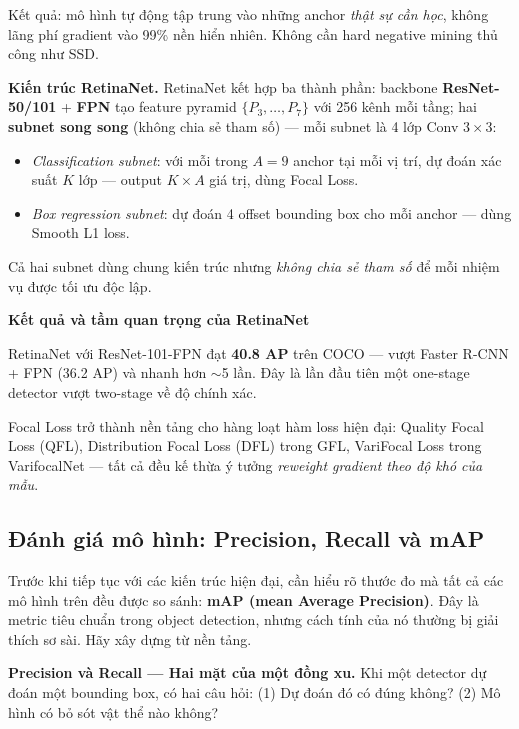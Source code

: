 Kết quả: mô hình tự động tập trung vào những anchor \textit{thật sự cần học}, không lãng phí gradient vào 99\% nền hiển nhiên. Không cần hard negative mining thủ công như SSD.

\textbf{Kiến trúc RetinaNet.}
RetinaNet kết hợp ba thành phần: backbone \textbf{ResNet-50/101} + \textbf{FPN} tạo feature pyramid $\{P_3, \ldots, P_7\}$ với 256 kênh mỗi tầng; hai \textbf{subnet song song} (không chia sẻ tham số) --- mỗi subnet là 4 lớp Conv $3\times3$:
\begin{itemize}
    \item \textit{Classification subnet}: với mỗi trong $A = 9$ anchor tại mỗi vị trí, dự đoán xác suất $K$ lớp --- output $K \times A$ giá trị, dùng Focal Loss.
    \item \textit{Box regression subnet}: dự đoán 4 offset bounding box cho mỗi anchor --- dùng Smooth L1 loss.
\end{itemize}

Cả hai subnet dùng chung kiến trúc nhưng \textit{không chia sẻ tham số} để mỗi nhiệm vụ được tối ưu độc lập.

\begin{mdframed}[style=infobox]
\textbf{Kết quả và tầm quan trọng của RetinaNet}

RetinaNet với ResNet-101-FPN đạt \textbf{40.8 AP} trên COCO --- vượt Faster R-CNN + FPN (36.2 AP) và nhanh hơn $\sim$5 lần. Đây là lần đầu tiên một one-stage detector vượt two-stage về độ chính xác.

Focal Loss trở thành nền tảng cho hàng loạt hàm loss hiện đại: Quality Focal Loss (QFL), Distribution Focal Loss (DFL) trong GFL, VariFocal Loss trong VarifocalNet --- tất cả đều kế thừa ý tưởng \textit{reweight gradient theo độ khó của mẫu}.
\end{mdframed}

\subsection{Đánh giá mô hình: Precision, Recall và mAP}
\label{subsec:map_evaluation}

Trước khi tiếp tục với các kiến trúc hiện đại, cần hiểu rõ thước đo mà tất cả các mô hình trên đều được so sánh: \textbf{mAP (mean Average Precision)}. Đây là metric tiêu chuẩn trong object detection, nhưng cách tính của nó thường bị giải thích sơ sài. Hãy xây dựng từ nền tảng.

\textbf{Precision và Recall --- Hai mặt của một đồng xu.}
Khi một detector dự đoán một bounding box, có hai câu hỏi: (1) Dự đoán đó có đúng không? (2) Mô hình có bỏ sót vật thể nào không?

